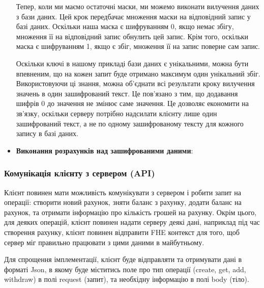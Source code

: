 \begin{itemize}
{Тепер, коли ми маємо остаточні маски, ми можемо виконати вилучення даних з бази даних. Цей крок
передбачає множення маски на відповідний запис у базі даних. Оскільки наша маска є шифруванням 0,
якщо немає збігу, множення її на відповідний запис обнулить цей запис. Крім того, оскільки маска
є шифруванням 1, якщо є збіг, множення її на запис поверне сам запис. 

Оскільки ключі в нашому прикладі бази даних є унікальними, можна бути впевненим, що на кожен
запит буде отримано максимум один унікальний збіг. Використовуючи ці знання, можна об'єднати всі
результати кроку вилучення значень в один зашифрований текст. Це пов'язано з тим, що додавання
шифрів 0 до значення не змінює саме значення. Це дозволяє економити на зв'язку, оскільки серверу
потрібно надсилати клієнту лише один зашифрований текст, а не по одному зашифрованому тексту для
кожного запису в базі даних.

}
    \item{\textbf{Виконання розрахунків над зашифрованими даними}:}
\end{itemize}


\subsubsection*{Комунікація клієнту з сервером (API)}
Клієнт повинен мати можливість комунікувати з сервером і робити запит на операції: створити
новий рахунок, зняти баланс з рахунку, додати баланс на рахунок, та отримати інформацію
про кількість грошей на рахунку. Окрім цього, для деяких операцій, клієнт повинен надати
серверу деякі дані, наприклад під час створення рахунку, клієнт повинен відправити FHE контекст
для того, щоб сервер міг правильно працювати з цими даними в майбутньому.

Для спрощення імплементації, клієнт буде відправляти та отримувати дані в форматі Json, в
якому буде міститись поле про тип операції (create, get, add, withdraw) в полі 
request (запит), та необхідну інформацію в полі body (тіло).


